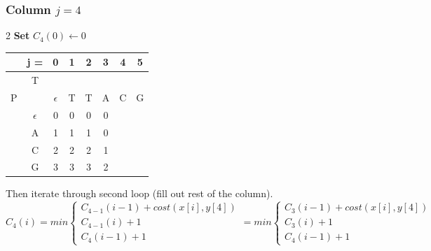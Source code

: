 \subsubsection*{Column $j = 4$}
\begin{multicols}{2}
    \textbf{Set} $C_4(0) \gets 0$

    \begin{center}
        \begin{tabular}{|c c|c|c|c|c|c|c|} \hline
        &   j =  &  0           &   1   &   2   &   3   &   4   &   5   \\ \hline
        &   T    &              &       &       &       &       &       \\
        P   &        &  $\epsilon$  &   T   &   T   &   A   &   C   &   G   \\ \hline
        & $\epsilon$ &       0      & 0     &0      & 0     &   \ccr0    &       \\ \hline
        &    A   &     1        &  1    &   1   & 0     &       &       \\ \hline
        &    C   & 2            &  2    &   2   & 1     &       &       \\ \hline
        &    G   & 3            &   3   &3      & 2     &       &       \\ \hline
        \end{tabular}
    \end{center}
\end{multicols}

Then iterate through second loop (fill out rest of the column).
\[
    C_4(i) = min \begin{cases}
                     C_{4-1}(i-1) + cost(x[i], y[4]) \\
                     C_{4-1}(i) + 1 \\
                     C_4(i-1) + 1
    \end{cases} =  min \begin{cases}
                           C_{3}(i-1) + cost(x[i], y[4]) \\
                           C_{3}(i) + 1 \\
                           C_4(i-1) + 1
    \end{cases}
\]



